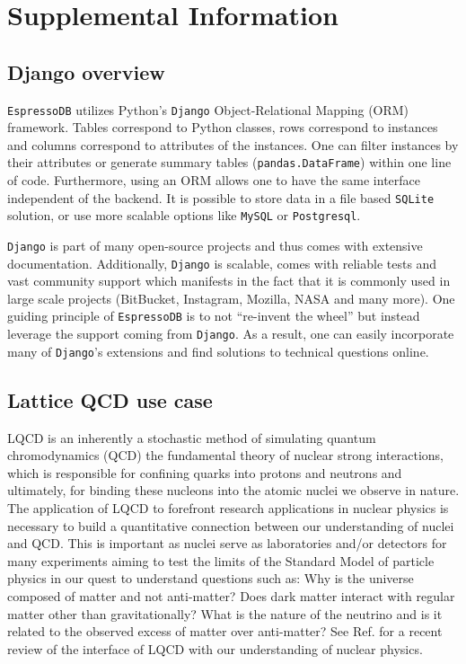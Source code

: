 \section{Supplemental Information}

\subsection{Django overview\label{django-overview}}

\texttt{EspressoDB} utilizes Python's \texttt{Django} Object-Relational
Mapping (ORM) framework. Tables correspond to Python classes, rows
correspond to instances and columns correspond to attributes of the
instances.  One can filter instances by their attributes
or generate summary tables (\texttt{pandas.DataFrame}) within one line
of code. Furthermore, using an ORM allows one to have the same interface
independent of the backend. It is possible to store data in a file based
\texttt{SQLite} solution, or use more scalable options like
\texttt{MySQL} or \texttt{Postgresql}.

\texttt{Django} is part of many open-source projects and thus comes with
extensive documentation. Additionally, \texttt{Django} is scalable,
comes with reliable tests and vast community support which manifests in
the fact that it is commonly used in large scale projects (BitBucket,
Instagram, Mozilla, NASA and many more). One guiding principle of
\texttt{EspressoDB} is to not ``re-invent the wheel'' but instead
leverage the support coming from \texttt{Django}. As a result, one can
easily incorporate many of \texttt{Django}'s extensions and find
solutions to technical questions online.

\subsection{Lattice QCD use case \label{lattice-qcd-use-case}}

LQCD is an inherently a stochastic method of simulating quantum
chromodynamics (QCD) the fundamental theory of nuclear strong
interactions, which is responsible for confining quarks into protons and
neutrons and ultimately, for binding these nucleons into the atomic
nuclei we observe in nature. The application of LQCD to forefront
research applications in nuclear physics is necessary to build a
quantitative connection between our understanding of nuclei and QCD.
This is important as nuclei serve as laboratories and/or detectors for
many experiments aiming to test the limits of the Standard Model of
particle physics in our quest to understand questions such as: Why is
the universe composed of matter and not anti-matter? Does dark matter
interact with regular matter other than gravitationally? What is the
nature of the neutrino and is it related to the observed excess of
matter over anti-matter? See Ref. \cite{Drischler:2019xuo} for a recent
review of the interface of LQCD with our understanding of nuclear
physics.

